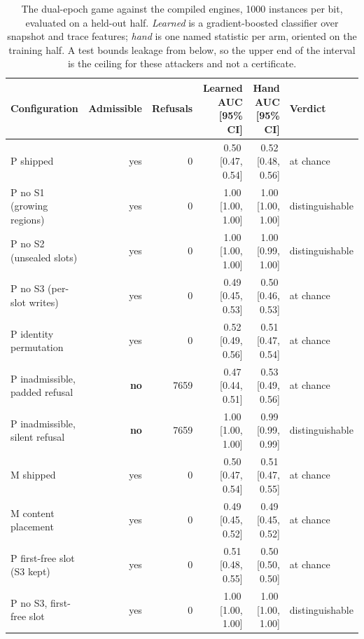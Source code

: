 \begin{table}[t]
\centering
\caption{The dual-epoch game against the compiled engines, 1000 instances per
bit, evaluated on a held-out half. \emph{Learned} is a gradient-boosted classifier over snapshot
and trace features; \emph{hand} is one named statistic per arm, oriented on the training half.
A test bounds leakage from below, so the upper end of the interval is the ceiling for these
attackers and not a certificate.}
\label{tab:e5}
\small
\setlength{\tabcolsep}{4pt}
\begin{tabular}{lrrrrl}
\toprule
Configuration & Admissible & Refusals & Learned AUC [95\% CI] & Hand AUC [95\% CI] & Verdict \\
\midrule
P shipped & yes & 0 & 0.50\,[0.47, 0.54] & 0.52\,[0.48, 0.56] & at chance \\
P no S1 (growing regions) & yes & 0 & 1.00\,[1.00, 1.00] & 1.00\,[1.00, 1.00] & distinguishable \\
P no S2 (unsealed slots) & yes & 0 & 1.00\,[1.00, 1.00] & 1.00\,[0.99, 1.00] & distinguishable \\
P no S3 (per-slot writes) & yes & 0 & 0.49\,[0.45, 0.53] & 0.50\,[0.46, 0.53] & at chance \\
P identity permutation & yes & 0 & 0.52\,[0.49, 0.56] & 0.51\,[0.47, 0.54] & at chance \\
P inadmissible, padded refusal & \textbf{no} & 7659 & 0.47\,[0.44, 0.51] & 0.53\,[0.49, 0.56] & at chance \\
P inadmissible, silent refusal & \textbf{no} & 7659 & 1.00\,[1.00, 1.00] & 0.99\,[0.99, 0.99] & distinguishable \\
M shipped & yes & 0 & 0.50\,[0.47, 0.54] & 0.51\,[0.47, 0.55] & at chance \\
M content placement & yes & 0 & 0.49\,[0.45, 0.52] & 0.49\,[0.45, 0.52] & at chance \\
P first-free slot (S3 kept) & yes & 0 & 0.51\,[0.48, 0.55] & 0.50\,[0.50, 0.50] & at chance \\
P no S3, first-free slot & yes & 0 & 1.00\,[1.00, 1.00] & 1.00\,[1.00, 1.00] & distinguishable \\
\bottomrule
\end{tabular}
\end{table}
